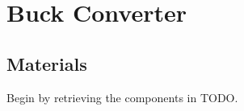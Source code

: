 \documentclass{article}
\newcommand{\resistor}[1]{$\text{#1} \Omega \text{ Resistor}$}
\begin{document}






\section{Buck Converter}

\subsection{Materials}
Begin by retrieving the components in TODO.
\end{document}
